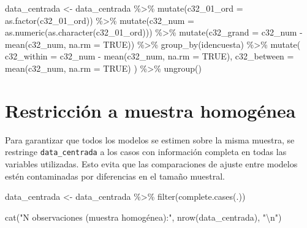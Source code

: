 \documentclass[
  spanish,
  a4paper,
  oneside]{scrbook}
\newenvironment{Shaded}{\begin{snugshade}}{\end{snugshade}}
\newcommand{\AttributeTok}[1]{\textcolor[rgb]{0.40,0.45,0.13}{#1}}
\newcommand{\ConstantTok}[1]{\textcolor[rgb]{0.56,0.35,0.01}{#1}}
\newcommand{\FunctionTok}[1]{\textcolor[rgb]{0.28,0.35,0.67}{#1}}
\newcommand{\NormalTok}[1]{\textcolor[rgb]{0.00,0.23,0.31}{#1}}
\newcommand{\OtherTok}[1]{\textcolor[rgb]{0.00,0.23,0.31}{#1}}
\newcommand{\SpecialCharTok}[1]{\textcolor[rgb]{0.37,0.37,0.37}{#1}}
\newcommand{\StringTok}[1]{\textcolor[rgb]{0.13,0.47,0.30}{#1}}
\begin{document}
\begin{Shaded}
\begin{Highlighting}[]
\NormalTok{data\_centrada }\OtherTok{\textless{}{-}}\NormalTok{ data\_centrada }\SpecialCharTok{\%\textgreater{}\%}
  \FunctionTok{mutate}\NormalTok{(}\AttributeTok{c32\_01\_ord =} \FunctionTok{as.factor}\NormalTok{(c32\_01\_ord)) }\SpecialCharTok{\%\textgreater{}\%}
  \FunctionTok{mutate}\NormalTok{(}\AttributeTok{c32\_num =} \FunctionTok{as.numeric}\NormalTok{(}\FunctionTok{as.character}\NormalTok{(c32\_01\_ord))) }\SpecialCharTok{\%\textgreater{}\%}
  \FunctionTok{mutate}\NormalTok{(}\AttributeTok{c32\_grand =}\NormalTok{ c32\_num }\SpecialCharTok{{-}} \FunctionTok{mean}\NormalTok{(c32\_num, }\AttributeTok{na.rm =} \ConstantTok{TRUE}\NormalTok{)) }\SpecialCharTok{\%\textgreater{}\%}
  \FunctionTok{group\_by}\NormalTok{(idencuesta) }\SpecialCharTok{\%\textgreater{}\%}
  \FunctionTok{mutate}\NormalTok{(}
    \AttributeTok{c32\_within  =}\NormalTok{ c32\_num }\SpecialCharTok{{-}} \FunctionTok{mean}\NormalTok{(c32\_num, }\AttributeTok{na.rm =} \ConstantTok{TRUE}\NormalTok{),}
    \AttributeTok{c32\_between =} \FunctionTok{mean}\NormalTok{(c32\_num, }\AttributeTok{na.rm =} \ConstantTok{TRUE}\NormalTok{)}
\NormalTok{  ) }\SpecialCharTok{\%\textgreater{}\%}
  \FunctionTok{ungroup}\NormalTok{()}
\end{Highlighting}
\end{Shaded}

\section{Restricción a muestra
homogénea}\label{restricciuxf3n-a-muestra-homoguxe9nea}

Para garantizar que todos los modelos se estimen sobre la misma muestra,
se restringe \texttt{data\_centrada} a los casos con información
completa en todas las variables utilizadas. Esto evita que las
comparaciones de ajuste entre modelos estén contaminadas por diferencias
en el tamaño muestral.

\begin{Shaded}
\begin{Highlighting}[]
\NormalTok{data\_centrada }\OtherTok{\textless{}{-}}\NormalTok{ data\_centrada }\SpecialCharTok{\%\textgreater{}\%}
  \FunctionTok{filter}\NormalTok{(}\FunctionTok{complete.cases}\NormalTok{(.))}

\FunctionTok{cat}\NormalTok{(}\StringTok{"N observaciones (muestra homogénea):"}\NormalTok{, }\FunctionTok{nrow}\NormalTok{(data\_centrada), }\StringTok{"}\SpecialCharTok{\textbackslash{}n}\StringTok{"}\NormalTok{)}
\end{Highlighting}
\end{Shaded}
\end{document}
